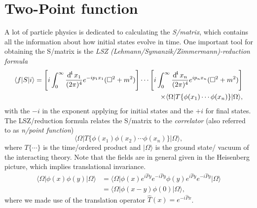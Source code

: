 \documentclass[../../index.tex]{subfiles}
\begin{document}
\section{Two-Point function}
\label{sec:twoPointFunction}
A lot of particle physics is dedicated to calculating the \textit{S\-/matrix},
which contains all the information about how initial states evolve in time. One
important tool for obtaining the S\-/matrix is the \textit{LSZ
  (Lehmann\-/Symanzik\-/Zimmermann)-reduction formula}
\cite{Lehmann1954a,Schwartz2013}
\begin{equation}
  \begin{split}
    \langle f\vert S \vert i\rangle = \left[ i\int_0^\infty \fdif{x_1}
      e^{-ip_1x_1} (\Box^2 + m^2)\right] \cdots
    \left[ i\int_0^\infty \fdif{x_n} e^{ip_nx_n} (\Box^2 + m^2)\right] \\
    \times \langle\Omega\vert T\{\phi(x_1)\cdots\phi(x_n)\} \vert\Omega\rangle,
  \end{split}
\end{equation}
with the $-i$ in the exponent applying for initial states and the $+i$ for final
states. The LSZ\-/reduction formula relates the S\-/matrix to the
\textit{correlator} (also referred to as \textit{n\-/point function})
\begin{equation}
  \langle\Omega\vert T\{\phi(x_1)\phi(x_2)\cdots\phi(x_n)\} \vert\Omega\rangle,
\end{equation}
where $T\{\cdots\}$ is the time\-/ordered product and $\vert\Omega\rangle$ is
the ground state/ vacuum of the interacting theory. Note that the fields are in
general given in the Heisenberg picture, which implies translational invariance.
\begin{equation}
  \begin{split}
    \langle\Omega\vert \phi(x)\phi(y) \vert\Omega\rangle &= \langle\Omega\vert \phi(x) e^{i\hat P y}e^{-i\hat P y}\phi(y)e^{i\hat P y}e^{-i\hat P y} \vert\Omega\rangle \\
    &= \langle\Omega\vert \phi(x-y)\phi(0) \vert\Omega\rangle,
  \end{split}
\end{equation}
where we made use of the translation operator $\hat T(x) = e^{-i \hat P x}$.
\end{document}
